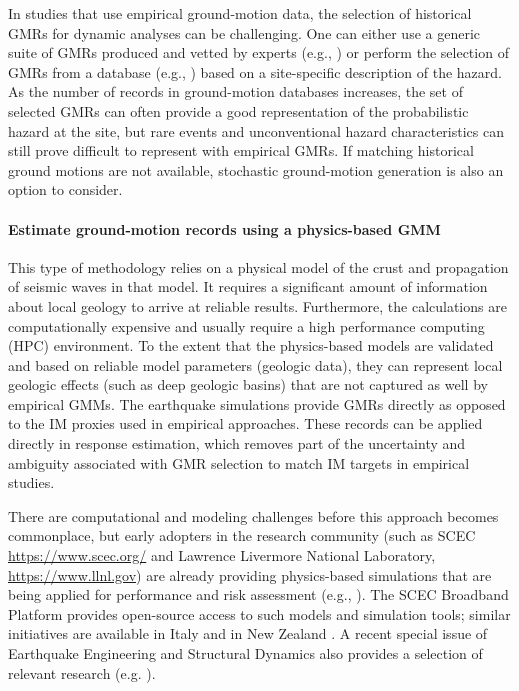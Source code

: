 In studies that use empirical ground-motion data, the selection of historical GMRs for dynamic analyses can be challenging. One can either use a generic suite of GMRs produced and vetted by experts (e.g., \cite{baker2011new}) or perform the selection of GMRs from a database (e.g., \cite{ancheta2014ngawest2}) based on a site-specific description of the hazard. As the number of records in ground-motion databases increases, the set of selected GMRs can often provide a good representation of the probabilistic hazard at the site, but rare events and unconventional hazard characteristics can still prove difficult to represent with empirical GMRs. If matching historical ground motions are not available, stochastic ground-motion generation is also an option to consider.

\paragraph{Estimate ground-motion records using a physics-based GMM} This type of methodology relies on a physical model of the crust and propagation of seismic waves in that model. It requires a significant amount of information about local geology to arrive at reliable results. Furthermore, the calculations are computationally expensive and usually require a high performance computing (HPC) environment. To the extent that the physics-based models are validated and based on reliable model parameters (geologic data), they can represent local geologic effects (such as deep geologic basins) that are not captured as well by empirical GMMs. The earthquake simulations provide GMRs directly as opposed to the IM proxies used in empirical approaches. These records can be applied directly in response estimation, which removes part of the uncertainty and ambiguity associated with GMR selection to match IM targets in empirical studies. 

There are computational and modeling challenges before this approach becomes commonplace, but early adopters in the research community (such as SCEC  \url{https://www.scec.org/} and Lawrence Livermore National Laboratory, \url{https://www.llnl.gov}) are already providing physics-based simulations that are being applied for performance and risk assessment (e.g., \cite{frankel2018broadband, rodgers2019effect}). The SCEC Broadband Platform \citep{maechling2015scec} provides open-source access to such models and simulation tools; similar initiatives are available in Italy \citep{damico2017synthesis} and in New Zealand \citep{bradley2017guidance}. A recent special issue of Earthquake Engineering and Structural Dynamics also provides a selection of relevant research (e.g. \cite{paolucci2021earthquake, kato2021regional, zhang2021computational, seylabi2021deterministic, kusakabe2021development}).

